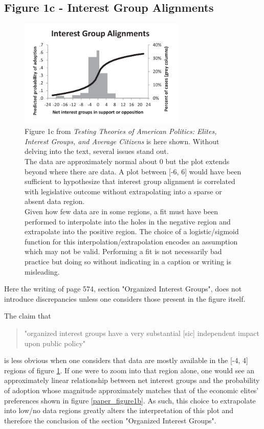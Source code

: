 \documentclass[]{article}
\begin{document}
\subsection{Figure 1c - Interest Group Alignments}
\begin{figure}[H]
	\begin{center}
		\includegraphics[width=300px]{./figures/paper/interest-group-preferences.png}
	\end{center}	
	\caption{Figure 1c from \textit{Testing Theories of American Politics: Elites, Interest Groups, and Average Citizens} is here shown. Without delving into the text, several issues stand out. \\The data are approximately normal about 0 but the plot extends beyond where there are data. A plot between [-6, 6] would have been sufficient to hypothesize that interest group alignment is correlated with legislative outcome without extrapolating into a sparse or absent data region. \\Given how few data are in some regions, a fit must have been performed to interpolate into the holes in the negative region and extrapolate into the positive region. The choice of a logistic/sigmoid function for this interpolation/extrapolation encodes an assumption which may not be valid. Performing a fit is not necessarily bad practice but doing so without indicating in a caption or writing is misleading.}
	\label{paper_figure1c}
\end{figure}

Here the writing of page 574, section "Organized Interest Groups", does not introduce discrepancies unless one considers those present in the figure itself.

The claim that \cite{gilens}
\begin{quotation}
	"organized interest groups have a very substantial [sic] independent impact upon public policy"
\end{quotation}
is less obvious when one considers that data are mostly available in the [-4, 4] regions of figure \ref{paper_figure1c}. 
If one were to zoom into that region alone, one would see an approximately linear relationship between net interest groups and the probability of adoption whose magnitude approximately matches that of the economic elites' preferences shown in figure \ref{paper_figure1b}.
As such, this choice to extrapolate into low/no data regions greatly alters the interpretation of this plot and therefore the conclusion of the section "Organized Interest Groups".\\
\end{document}

